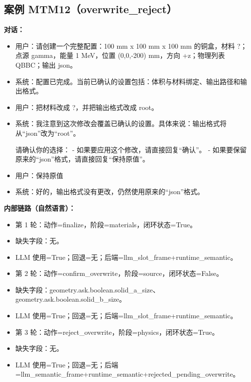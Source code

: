 \documentclass[11pt]{ctexart}
\begin{document}
\subsection{案例 MTM12（overwrite\_reject）}
\textbf{对话：}
\begin{itemize}
\item 用户：请创建一个完整配置：100 mm x 100 mm x 100 mm 的铜盒，材料 ?；点源 gamma，能量 1 MeV，位置 (0,0,-200) mm，方向 +z；物理列表 QBBC；输出 json。
\item 系统：配置已完成。当前已确认的设置包括：体积与材料绑定、输出路径和输出格式。
\item 用户：把材料改成 ?，并把输出格式改成 root。
\item 系统：我注意到这次修改会覆盖已确认的设置。具体来说：输出格式将从“json”改为“root”。

请确认你的选择：
- 如果要应用这个修改，请直接回复“确认”。
- 如果要保留原来的“json”格式，请直接回复“保持原值”。
\item 用户：保持原值
\item 系统：好的，输出格式没有更改，仍然使用原来的“json”格式。
\end{itemize}
\textbf{内部链路（自然语言）：}
\begin{itemize}
\item 第 1 轮：动作=finalize，阶段=materials，闭环状态=True。
\item 缺失字段：无。
\item LLM 使用=True；回退=无；后端=llm\_slot\_frame+runtime\_semantic。
\item 第 2 轮：动作=confirm\_overwrite，阶段=source，闭环状态=False。
\item 缺失字段：geometry.ask.boolean.solid\_a\_size、geometry.ask.boolean.solid\_b\_size。
\item LLM 使用=True；回退=无；后端=llm\_slot\_frame+runtime\_semantic。
\item 第 3 轮：动作=reject\_overwrite，阶段=physics，闭环状态=True。
\item 缺失字段：无。
\item LLM 使用=True；回退=无；后端=llm\_semantic\_frame+runtime\_semantic+rejected\_pending\_overwrite。
\end{itemize}
\end{document}
